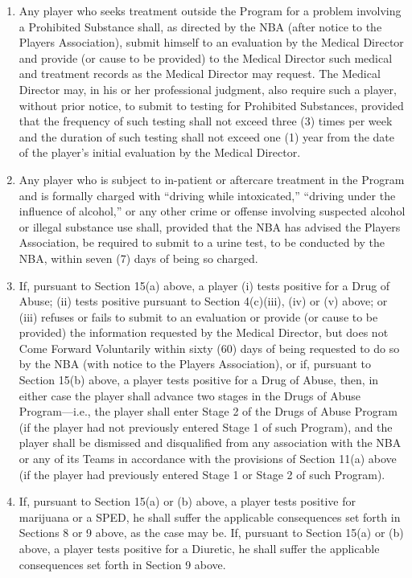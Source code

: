 \documentclass[
]{book}
\providecommand{\tightlist}{%
  \setlength{\itemsep}{0pt}\setlength{\parskip}{0pt}}
\begin{document}
\begin{enumerate}
\def\labelenumi{(\alph{enumi})}
\tightlist
\item
  Any player who seeks treatment outside the Program for a problem involving a Prohibited Substance shall, as directed by the NBA (after notice to the Players Association), submit himself to an evaluation by the Medical Director and provide (or cause to be provided) to the Medical Director such medical and treatment records as the Medical Director may request. The Medical Director may, in his or her professional judgment, also require such a player, without prior notice, to submit to testing for Prohibited Substances, provided that the frequency of such testing shall not exceed three (3) times per week and the duration of such testing shall not exceed one (1) year from the date of the player's initial evaluation by the Medical Director.
\item
  Any player who is subject to in-patient or aftercare treatment in the Program and is formally charged with ``driving while intoxicated,'' ``driving under the influence of alcohol,'' or any other crime or offense involving suspected alcohol or illegal substance use shall, provided that the NBA has advised the Players Association, be required to submit to a urine test, to be conducted by the NBA, within seven (7) days of being so charged.
\item
  If, pursuant to Section 15(a) above, a player (i) tests positive for a Drug of Abuse; (ii) tests positive pursuant to Section 4(c)(iii), (iv) or (v) above; or (iii) refuses or fails to submit to an evaluation or provide (or cause to be provided) the information requested by the Medical Director, but does not Come Forward Voluntarily within sixty (60) days of being requested to do so by the NBA (with notice to the Players Association), or if, pursuant to Section 15(b) above, a player tests positive for a Drug of Abuse, then, in either case the player shall advance two stages in the Drugs of Abuse Program---i.e., the player shall enter Stage 2 of the Drugs of Abuse Program (if the player had not previously entered Stage 1 of such Program), and the player shall be dismissed and disqualified from any association with the NBA or any of its Teams in accordance with the provisions of Section 11(a) above (if the player had previously entered Stage 1 or Stage 2 of such Program).
\item
  If, pursuant to Section 15(a) or (b) above, a player tests positive for marijuana or a SPED, he shall suffer the applicable consequences set forth in Sections 8 or 9 above, as the case may be. If, pursuant to Section 15(a) or (b) above, a player tests positive for a Diuretic, he shall suffer the applicable consequences set forth in Section 9 above.

\end{enumerate}
\end{document}
